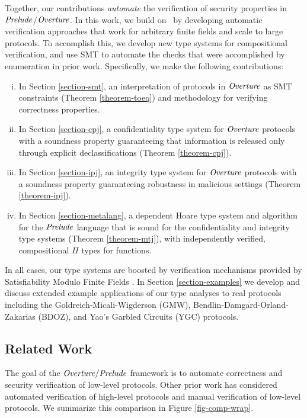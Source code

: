 Together, our contributions \emph{automate} the verification of security
properties in $\mathit{Prelude}$/$\mathit{Overture}$. In this work, we build on~\cite{skalka-near-ppdp24}
by developing automatic verification approaches that work for arbitrary
finite fields and scale to large protocols. To accomplish this, we develop new
type systems for compositional verification, and use SMT to automate the checks
that were accomplished by enumeration in prior work. Specifically, we make the
following contributions:
%
\begin{enumerate}[i.]
\item In Section \ref{section-smt}, an interpretation of protocols in
  $\mathit{Overture}$ as SMT constraints (Theorem \ref{theorem-toeq}) and
  methodology for verifying correctness properties.
\item In Section \ref{section-cpj}, a confidentiality type system for
  $\mathit{Overture}$ protocols with a soundness property guaranteeing that
  information is released only through explicit declassifications
  (Theorem \ref{theorem-cpj}).
\item In Section \ref{section-ipj}, an integrity type system for
  $\mathit{Overture}$ protocols with a soundness property guaranteeing
  robustness in malicious settings (Theorem \ref{theorem-ipj}).
\item In Section \ref{section-metalang}, a dependent Hoare type system and
  algorithm for the $\mathit{Prelude}$ language that is sound for the
  confidentiality and integrity type systems (Theorem
  \ref{theorem-mtj}), with independently verified, compositional $\Pi$
  types for functions.
\end{enumerate}
In all cases, our type systems are boosted by verification mechanisms
provided by Satisfiability Modulo Finite Fields \cite{SMFF}. In
Section \ref{section-examples} we develop and discuss extended example
applications of our type analyses to real protocols including
the Goldreich-Micali-Wigderson (GMW), Bendlin-Damgard-Orland-Zakarias
(BDOZ), and Yao's Garbled Circuits (YGC) protocols.

\subsection{Related Work}
\label{section-related-work}

The goal of the $\mathit{Overture}/\mathit{Prelude}$ framework is to automate
correctness and security verification of low-level protocols.  Other
prior work has considered automated verification of high-level
protocols and manual verification of low-level protocols.  We
summarize this comparison in Figure \ref{fig-comp-wrap}.

